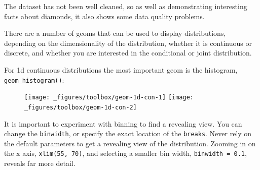 The dataset has not been well cleaned, so as well as demonstrating
interesting facts about diamonds, it also shows some data quality
problems.


There are a number of geoms that can be used to display distributions,
depending on the dimensionality of the distribution, whether it is
continuous or discrete, and whether you are interested in the
conditional or joint distribution. 

For 1d continuous distributions the most important geom is the
histogram, \texttt{geom\_histogram()}: 

\begin{Shaded}
\begin{Highlighting}[]
\StringTok{ }
\StringTok{  }\NormalTok{()}
\StringTok{ }
\StringTok{  }\NormalTok{(} \NormalTok{) +}\StringTok{ }
\StringTok{  }\NormalTok{(}\NormalTok{, }\NormalTok{)}
\end{Highlighting}
\end{Shaded}

\begin{figure}[H]
  \texttt{[image: \_figures/toolbox/geom-1d-con-1]}%
  \texttt{[image: \_figures/toolbox/geom-1d-con-2]}
\end{figure}

It is important to experiment with binning to find a revealing view. You
can change the \texttt{binwidth}, or specify the exact location of the
\texttt{breaks}. Never rely on the default parameters to get a revealing
view of the distribution. Zooming in on the x axis,
\texttt{xlim(55,\ 70)}, and selecting a smaller bin width,
\texttt{binwidth\ =\ 0.1}, reveals far more detail.


